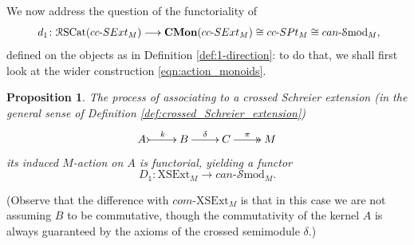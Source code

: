 \documentclass[a4paper]{amsart}
\theoremstyle{plain}
\newtheorem{proposition}[subsection]{Proposition}
\theoremstyle{definition}
\theoremstyle{remark}
\begin{document}
We now address the question of the functoriality of
\begin{equation}
\resizebox{0.9\textwidth}{!}
{\label{eqn:new_functor_d_1}
$d_1\colon\mathcal{R}\mathrm{SCat}(cc\text{-}SExt_M)\longrightarrow \mathbf{CMon}(cc\text{-}SExt_M)\cong cc\text{-}SPt_M\cong can\text{-}\mathcal{S}\mathrm{mod}_M,$}
\end{equation}
defined on the objects as in Definition \ref{def:1-direction}: to do that, we shall first look at the wider construction \eqref{eqn:action_monoids}.
\begin{proposition}
\label{prop:functor_D_1}
The process of associating to a crossed Schreier extension (in the general sense of Definition \ref{def:crossed_Schreier_extension})
\begin{equation*}
\xymatrix{
A \ar@{>->}[r]^-k &B \ar[r]^-{\delta} &C \ar@{->>}[r]^-{\pi} &M
}
\end{equation*}
its induced $M$-action on $A$ is functorial, yielding a functor
\begin{equation}
D_1\colon \mathrm{XSExt}_M\longrightarrow can\text{-}\mathcal{S}\mathrm{mod}_M.
\end{equation}
\end{proposition}
(Observe that the difference with $com\text{-}\mathrm{XSExt}_M$ is that in this case we are not assuming $B$ to be commutative, though the commutativity of the kernel $A$ is always guaranteed by the axioms of the crossed semimodule $\delta.$)
\end{document}
